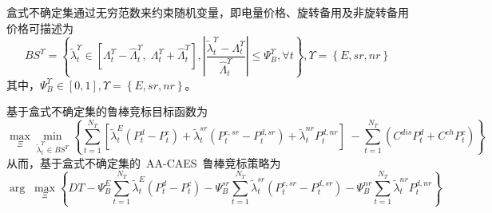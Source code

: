 盒式不确定集通过无穷范数来约束随机变量，即电量价格、旋转备用及非旋转备用价格可描述为
\begin{equation}
\label{equ:price-uncertainty-BS}
B{S^\Upsilon } = \left\{ {\tilde \lambda _t^\Upsilon  \in \left[ {\Lambda _t^\Upsilon  - \hat \Lambda _t^\Upsilon ,\;\Lambda _t^\Upsilon  + \hat \Lambda _t^\Upsilon } \right],\left| {\frac{{\tilde \lambda _t^\Upsilon  - \Lambda _t^\Upsilon }}{{\hat \Lambda _t^\Upsilon }}} \right| \le \Psi _B^\Upsilon ,\forall t} \right\},\Upsilon  = \left\{ {E,sr,nr} \right\}
\end{equation}
其中，$\Psi _B^\Upsilon  \in \left[ {0,1} \right],\Upsilon  = \left\{ {E,sr,nr} \right\}$。

基于盒式不确定集的鲁棒竞标目标函数为
\begin{equation}
\mathop {\max }\limits_\Xi  \mathop {\min }\limits_{\tilde \lambda _t^\Upsilon  \in B{S^\Upsilon }} \left\{ {\sum\limits_{t = 1}^{N_T} {\left[ {\tilde \lambda _t^E({P_t^d - P_t^c}) + \tilde \lambda _t^{sr}({P_t^{c,sr} - P_t^{d,sr}}) + \tilde \lambda _t^{nr}P_t^{d,nr}} \right]} \; - \sum\limits_{t = 1}^{N_T} {({C^{dis}P_t^d + C^{ch}P_t^c})}} \right\}
\end{equation}
从而，基于盒式不确定集的~AA-CAES~鲁棒竞标策略为
\begin{equation}
\label{equ:aa-caes-self-schedule-BS-uncertainty}
\arg \;\mathop {\max }\limits_\Xi  \left\{ {DT - \Psi _B^E\sum\limits_{t = 1}^{N_T} {\tilde \lambda _t^E({P_t^d - P_t^c})} -\Psi _B^{sr}\sum\limits_{t = 1}^{N_T} {\tilde \lambda _t^{sr}({P_t^{c,sr} - P_t^{d,sr}})} - \Psi _B^{nr}\sum\limits_{t = 1}^{N_T} {\tilde \lambda _t^{nr}P_t^{d,nr}} } \right\}
\end{equation}


